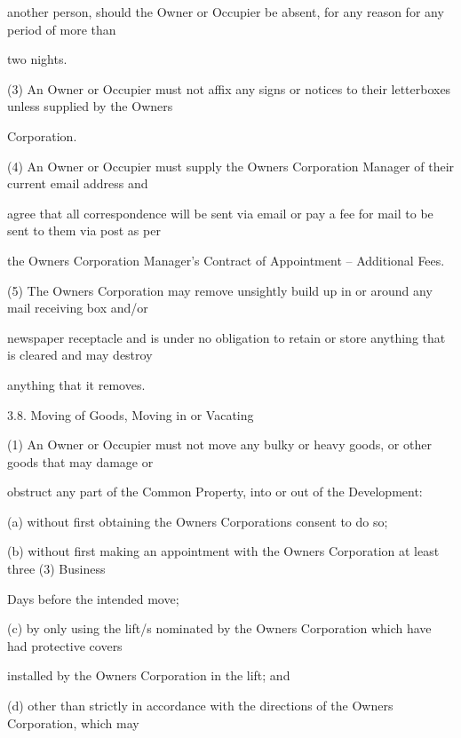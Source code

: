 \documentclass{article}
\begin{document}
{\fontsize{10.02}{1}another person, should the Owner or Occupier be absent, for any reason for any period of more than }

{\fontsize{10.02}{1}two nights. }

\newpage

{\fontsize{9.962}{1}(3) An Owner or Occupier must not affix any signs or notices to their letterboxes unless supplied by the Owners }

{\fontsize{10.02}{1}Corporation. }

{\fontsize{9.962}{1}(4) An Owner or Occupier must supply the Owners Corporation Manager of their current email address and }

{\fontsize{10.02}{1}agree that all correspondence will be sent via email or pay a fee for mail to be sent to them via post as per }

{\fontsize{10.02}{1}the Owners Corporation Manager’s Contract of Appointment – Additional Fees. }

{\fontsize{9.962}{1}(5) The Owners Corporation may remove unsightly build up in or around any mail receiving box and/or }

{\fontsize{10.02}{1}newspaper receptacle and is under no obligation to retain or store anything that is cleared and may destroy }

{\fontsize{10.02}{1}anything that it removes. }

{\fontsize{9.99}{1}3.8. Moving of Goods, Moving in or Vacating }

{\fontsize{9.962}{1}(1) An Owner or Occupier must not move any bulky or heavy goods, or other goods that may damage or }

{\fontsize{10.02}{1}obstruct any part of the Common Property, into or out of the Development: }

{\fontsize{9.962}{1}(a) without first obtaining the Owners Corporations consent to do so; }

{\fontsize{9.962}{1}(b) without first making an appointment with the Owners Corporation at least three (3) Business }

{\fontsize{10.02}{1}Days before the intended move; }

{\fontsize{9.962}{1}(c) by only using the lift/s nominated by the Owners Corporation which have had protective covers }

{\fontsize{10.02}{1}installed by the Owners Corporation in the lift; and }

{\fontsize{9.962}{1}(d) other than strictly in accordance with the directions of the Owners Corporation, which may }
\end{document}
